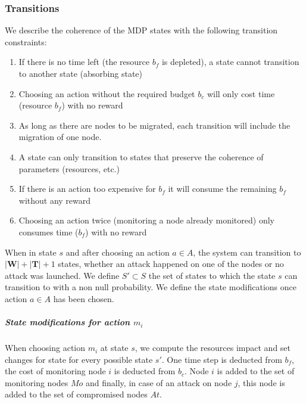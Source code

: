 \subsubsection{Transitions}
We describe the coherence of the MDP states with the following transition constraints:

\begin{enumerate}
    \item If there is no time left (\ie the resource $b_f$ is depleted), a state cannot transition to another state (absorbing state)
    \label{cond:c1}
    \item Choosing an action without the required budget $b_c$ will only cost time (resource $b_f$) with no reward
    \label{cond:c2}
    \item As long as there are nodes to be migrated, each transition will include the migration of one node.
    \label{cond:c3}
    \item A state can only transition to states that preserve the coherence of parameters (resources, etc.)
    \label{cond:c4}
    \item If there is an action too expensive for $b_f$ it will consume the remaining $b_f$ without any reward
    \label{cond:c5}
    \item Choosing an action twice (\ie monitoring a node already monitored) only consumes time ($b_f$) with no reward
    \label{cond:c6}
 \end{enumerate}


When in state $s$ and after choosing an action $a \in A$, the system can transition to $|\textbf{W}|+|\textbf{T}| + 1 $ states, whether an attack happened on one of the nodes or no attack was launched.
We define $S' \subset S$ the set of states to which the state $s$ can transition to with a non null probability.
We define the state modifications once action $a \in A$ has been chosen.
\\
\subparagraph*{\textbf{State modifications for action $m_i$}}
When choosing action $m_i$ at state $s$, we compute the resources impact and set changes for state for every possible state $s'$. One time step is deducted from $b_f$, the cost of monitoring node $i$ is deducted from $b_c$. Node $i$ is added to the set of monitoring nodes $Mo$ and finally, in case of an attack on node $j$, this node is added to the set of compromised nodes $At$.

